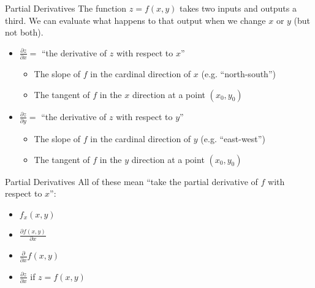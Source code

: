 \documentclass[aspectratio=169]{beamer}
\begin{document}

\begin{frame}{Partial Derivatives}\label{main1}
    The function $z = f(x, y)$ takes two inputs and outputs a third.  We can evaluate what happens to that output when we change $x$ or $y$ (but not both).
    \begin{itemize}
        \item $\frac{\partial z}{\partial x} =$ “the derivative of $z$ with respect to $x$”
        \begin{itemize}
        \item The slope of $f$ in the cardinal direction of $x$ (e.g. “north-south”)
        \item The tangent of $f$ in the $x$ direction at a point $(x_0, y_0)$
        \end{itemize}
        \item $\frac{\partial z}{\partial y} =$ “the derivative of $z$ with respect to $y$”
        \begin{itemize}
        \item The slope of $f$ in the cardinal direction of $y$ (e.g. “east-west”)
        \item The tangent of $f$ in the $y$ direction at a point $(x_0, y_0)$
    	\end{itemize}
    \end{itemize}
\end{frame}

\begin{frame}{Partial Derivatives}\label{main1}
    All of these mean “take the partial derivative of $f$ with respect to $x$”:
    \begin{itemize}
        \item $f_x(x, y)$
        \item $\frac{\partial f(x, y)}{\partial x}$
        \item $\frac{\partial}{\partial x} f(x, y)$
        \item $\frac{\partial z}{\partial x}$ if $z = f(x, y)$
    \end{itemize}
\end{frame}
\end{document}
